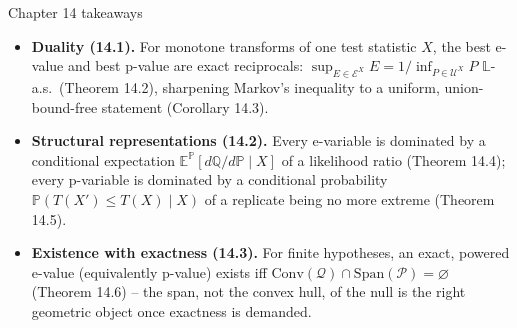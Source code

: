 \documentclass[aspectratio=169,10pt]{beamer}
\newcommand{\PP}{\mathbb{P}}
\newcommand{\QQ}{\mathbb{Q}}
\newcommand{\EE}{\mathbb{E}}
\newcommand{\calE}{\mathcal{E}}
\newcommand{\calU}{\mathcal{U}}
\newcommand{\calP}{\mathcal{P}}
\newcommand{\calQ}{\mathcal{Q}}
\newcommand{\Conv}{\mathrm{Conv}}
\newcommand{\Span}{\mathrm{Span}}
\begin{document}
\begin{frame}{Chapter 14 takeaways}
  \begin{itemize}
    \item \textbf{Duality (14.1).} For monotone transforms of one test
      statistic $X$, the best e-value and best p-value are exact
      reciprocals: $\sup_{E\in\calE^X} E = 1/\inf_{P\in\calU^X} P$
      $\mathbb{L}$-a.s.\ (Theorem 14.2), sharpening Markov's inequality to
      a uniform, union-bound-free statement (Corollary 14.3).
    \item \textbf{Structural representations (14.2).} Every e-variable is
      dominated by a conditional expectation $\EE^{\PP}[d\QQ/d\PP\mid X]$
      of a likelihood ratio (Theorem 14.4); every p-variable is dominated
      by a conditional probability $\PP(T(X')\leq T(X)\mid X)$ of a
      replicate being no more extreme (Theorem 14.5).
    \item \textbf{Existence with exactness (14.3).} For finite hypotheses,
      an exact, powered e-value (equivalently p-value) exists iff
      $\Conv(\calQ) \cap \Span(\calP) = \varnothing$ (Theorem 14.6) --
      the span, not the convex hull, of the null is the right geometric
      object once exactness is demanded.
  \end{itemize}
\end{frame}
\end{document}
